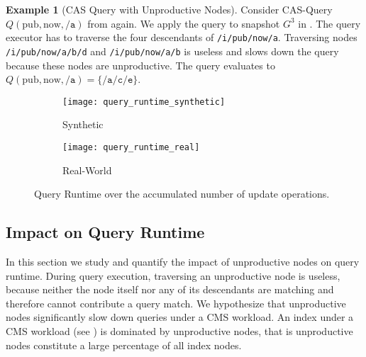 \documentclass[abstracton,12pt]{scrartcl}
\theoremstyle{definition}
\newtheorem{example}{Example}
\begin{document}
\begin{example}[CAS Query with Unproductive Nodes]
  Consider CAS-Query $Q(\text{pub},\text{now},\texttt{/a})$ from
   again. We apply the query to snapshot $G^3$ in
  . The query executor has to traverse the four
  descendants of \texttt{/i/pub/now/a}. Traversing nodes
  \texttt{/i/pub/now/a/b/d} and \texttt{/i/pub/now/a/b} is useless and slows down the
  query because these nodes are unproductive. The query evaluates to
  $Q(\text{pub},\text{now},\texttt{/a}) = \{\texttt{/a/c/e}\}$.
\end{example}

\newpage

\begin{figure}[t]
  \centering
  \begin{subfigure}{0.49\linewidth}
    \centering
    \caption{Synthetic}
    \texttt{[image: query\_runtime\_synthetic]}
    \label{fig:query_runtime_synthetic}
  \end{subfigure}
  \begin{subfigure}{0.49\linewidth}
    \centering
    \caption{Real-World}
    \texttt{[image: query\_runtime\_real]}
    \label{fig:query_runtime_real}
  \end{subfigure}
  \vspace{-0.65cm}
  \caption[Query Runtime over the accumulated number of update operations]{
  Query Runtime over the accumulated number of update operations.}
  \label{fig:query_runtime}
\end{figure}


\subsection{Impact on Query Runtime}

\label{sec:query-runtime}

In this section we study and quantify the impact of unproductive nodes on
query runtime. During query execution, traversing an unproductive node is
useless, because neither the node itself nor any of its descendants are matching
and therefore cannot contribute a query match. We hypothesize that unproductive nodes
significantly slow down queries under a CMS workload.
An index under a CMS workload (see ) is dominated
by unproductive nodes, that is unproductive nodes constitute a large percentage
of all index nodes.
\end{document}
